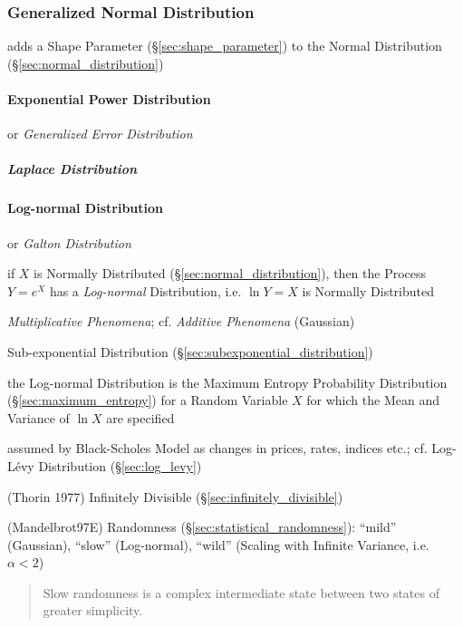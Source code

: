 \subsubsection{Generalized Normal Distribution}\label{sec:generalized_normal}

adds a Shape Parameter (\S\ref{sec:shape_parameter}) to the Normal Distribution
(\S\ref{sec:normal_distribution})



\paragraph{Exponential Power Distribution}\label{sec:exponential_power}\hfill

or \emph{Generalized Error Distribution}



\subparagraph{Laplace Distribution}\label{sec:laplace_distribution}\hfill



\paragraph{Log-normal Distribution}\label{sec:lognormal_distribution}\hfill

or \emph{Galton Distribution}

if $X$ is Normally Distributed (\S\ref{sec:normal_distribution}), then the
Process $Y = e^X$ has a \emph{Log-normal} Distribution, i.e. $\ln Y = X$ is
Normally Distributed

\emph{Multiplicative Phenomena}; cf. \emph{Additive Phenomena} (Gaussian)

Sub-exponential Distribution (\S\ref{sec:subexponential_distribution})

the Log-normal Distribution is the Maximum Entropy Probability Distribution
(\S\ref{sec:maximum_entropy}) for a Random Variable $X$ for which the Mean and
Variance of $\ln X$ are specified

assumed by Black-Scholes Model as changes in prices, rates, indices etc.; cf.
Log-L\'evy Distribution (\S\ref{sec:log_levy})

(Thorin 1977) Infinitely Divisible (\S\ref{sec:infinitely_divisible})

(Mandelbrot97E) Randomness (\S\ref{sec:statistical_randomness}): ``mild''
(Gaussian), ``slow'' (Log-normal), ``wild'' (Scaling with Infinite Variance,
i.e. $\alpha < 2$)

\begin{quote}
  Slow randomness is a complex intermediate state between two states of greater
  simplicity.
\end{quote}

